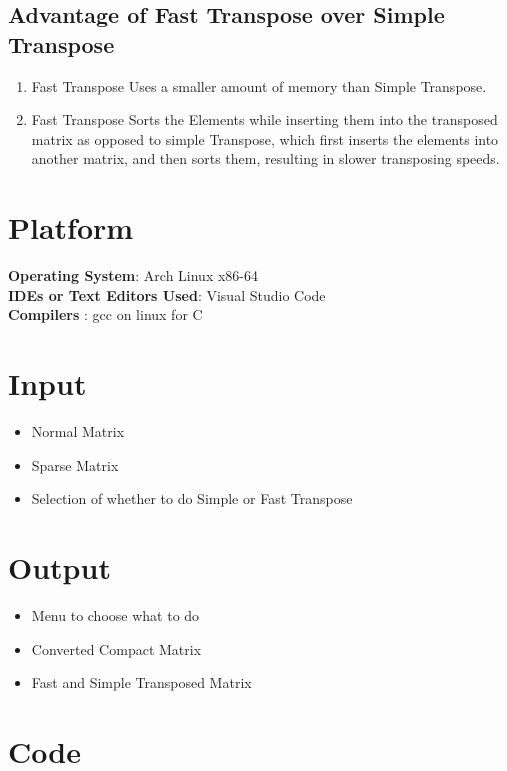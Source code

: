 \documentclass[11pt]{article}
\begin{document}
\subsection{Advantage of Fast Transpose over Simple Transpose}

\begin{enumerate}
	\item Fast Transpose Uses a smaller amount of memory than Simple Transpose.
	\item Fast Transpose Sorts the Elements while inserting them into the transposed matrix as opposed to simple Transpose, which first inserts the elements into another matrix, and then sorts them, resulting in slower transposing speeds.
\end{enumerate}

\section{Platform}
\textbf{Operating System}: Arch Linux x86-64 \\
\textbf{IDEs or Text Editors Used}: Visual Studio Code\\
\textbf{Compilers} : gcc on linux for C\\

\section{Input}

\begin{itemize}
	\item Normal Matrix
	\item Sparse Matrix
	\item Selection of whether to do Simple or Fast Transpose
\end{itemize}

\section{Output}
\begin{itemize}
	\item Menu to choose what to do
	\item Converted Compact Matrix
	\item Fast and Simple Transposed Matrix
\end{itemize}

\section{Code}
\end{document}

